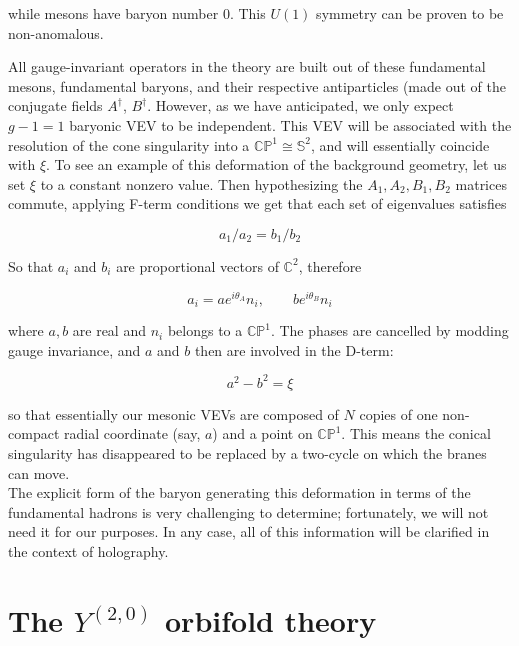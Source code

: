 while mesons have baryon number $0$. This $U(1)$ symmetry can be proven to be non-anomalous.

All gauge-invariant operators in the theory are built out of these fundamental mesons, fundamental baryons, and their respective antiparticles (made out of the conjugate fields $A^\dagger$, $B^\dagger$. However, as we have anticipated, we only expect $g-1 = 1$ baryonic VEV to be independent. This VEV will be associated with the resolution of the cone singularity into a $\mathbb{CP}^1 \cong \mathbb{S}^2$, and will essentially coincide with $\xi$. To see an example of this deformation of the background geometry, let us set $\xi$ to a constant nonzero value. Then hypothesizing the $A_1, A_2, B_1, B_2$ matrices commute, applying F-term conditions we get that each set of eigenvalues satisfies

\begin{equation}
	a_1/a_2 = b_1/b_2
	\label{}
\end{equation}

So that $a_i$ and $b_i$ are proportional vectors of $\mathbb{C}^2$, therefore

\begin{equation}
	a_i = a e^{i\theta_A} n_i, \quad \quad b e^{i\theta_B} n_i
	\label{}
\end{equation}

where $a,b$ are real and $n_i$ belongs to a $\mathbb{CP}^1$. The phases are cancelled by modding gauge invariance, and $a$ and $b$ then are involved in the D-term:

\begin{equation}
	a^2 - b^2 = \xi
	\label{}
\end{equation}

so that essentially our mesonic VEVs are composed of $N$ copies of one non-compact radial coordinate (say, $a$) and a point on $\mathbb{CP}^1$. This means the conical singularity has disappeared to be replaced by a two-cycle on which the branes can move.\\

The explicit form of the baryon generating this deformation in terms of the fundamental hadrons is very challenging to determine\cite{Forcella}; fortunately, we will not need it for our purposes. In any case, all of this information will be clarified in the context of holography.

\section{The $Y^{(2,0)}$ orbifold theory}\label{sec:squares}

